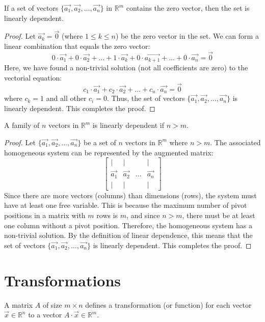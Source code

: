 \begin{theorem}
    If a set of vectors $\{\vec{a_1}, \vec{a_2}, \ldots, \vec{a_n}\}$ in $\mathbb{R}^m$ contains the zero vector, then the set is linearly dependent.
\end{theorem}
\begin{proof}
    Let $\vec{a_k} = \vec{0}$ (where $1 \leq k \leq n$) be the zero vector in the set. We can form a linear combination that equals the zero vector:
    \[
        0 \cdot \vec{a_1} + 0 \cdot \vec{a_2} + \ldots + 1 \cdot \vec{a_k} + 0 \cdot \vec{a_{k+1}} + \ldots + 0 \cdot \vec{a_n} = \vec{0}
    \]
    Here, we have found a non-trivial solution (not all coefficients are zero) to the vectorial equation:
    \[
        c_1 \cdot \vec{a_1} + c_2 \cdot \vec{a_2} + \ldots + c_n \cdot \vec{a_n} = \vec{0}
    \]
    where $c_k = 1$ and all other $c_i = 0$. Thus, the set of vectors $\{\vec{a_1}, \vec{a_2}, \ldots, \vec{a_n}\}$ is linearly dependent. This completes the proof.
\end{proof}

\begin{theorem}
    A family of $n$ vectors in $\mathbb{R}^m$ is linearly dependent if $n > m$.
\end{theorem}
\begin{proof}
    Let $\{\vec{a_1}, \vec{a_2}, \ldots, \vec{a_n}\}$ be a set of $n$ vectors in $\mathbb{R}^m$ where $n > m$. The associated homogeneous system can be represented by the augmented matrix:
    \[
        \begin{bmatrix}
            | & | & & | \\
            \vec{a_1} & \vec{a_2} & \ldots & \vec{a_n} \\
            | & | & & |
        \end{bmatrix}
    \]
    Since there are more vectors (columns) than dimensions (rows), the system must have at least one free variable. This is because the maximum number of pivot positions in a matrix with $m$ rows is $m$, and since $n > m$, there must be at least one column without a pivot position. Therefore, the homogeneous system has a non-trivial solution. By the definition of linear dependence, this means that the set of vectors $\{\vec{a_1}, \vec{a_2}, \ldots, \vec{a_n}\}$ is linearly dependent. This completes the proof.
\end{proof}

\section{Transformations}
A matrix $A$ of size $m \times n$ defines a transformation (or function) for each vector $\vec{x} \in \mathbb{R}^n$ to a vector $A \cdot \vec{x} \in \mathbb{R}^m$.

